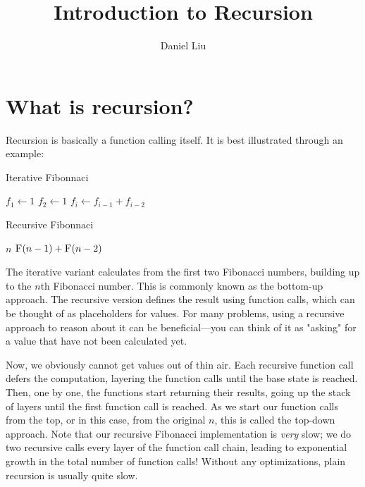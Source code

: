 \documentclass{article}
\title{Introduction to Recursion}
\author{Daniel Liu}
\begin{document}
    \maketitle

    \section{What is recursion?}
    Recursion is basically a function calling itself. It is best illustrated through an example:

    \begin{algorithm}
        \caption{Iterative Fibonnaci}
        \begin{algorithmic}[1]
                \State $f_1 \gets 1$
                \State $f_2 \gets 1$
                    \State $f_i \gets f_{i - 1} + f_{i - 2}$
                \EndFor
                \State {}
            \EndFunction
        \end{algorithmic}
    \end{algorithm}

    \begin{algorithm}
        \caption{Recursive Fibonnaci}
        \begin{algorithmic}[1]
                    \State \Return $n$
                \Else
                    \State \Return $\Call{F}{n - 1} + \Call{F}{n - 2}$
                \EndIf
            \EndFunction
        \end{algorithmic}
    \end{algorithm}

    The iterative variant calculates from the first two Fibonacci numbers, building up to the $n$th Fibonacci number. This is commonly known as the bottom-up approach. The recursive version defines the result using function calls, which can be thought of as placeholders for values. For many problems, using a recursive approach to reason about it can be beneficial---you can think of it as "asking" for a value that have not been calculated yet.

    Now, we obviously cannot get values out of thin air. Each recursive function call defers the computation, layering the function calls until the base state is reached. Then, one by one, the functions start returning their results, going up the stack of layers until the first function call is reached. As we start our function calls from the top, or in this case, from the original $n$, this is called the top-down approach. Note that our recursive Fibonacci implementation is \textit{very} slow; we do two recursive calls every layer of the function call chain, leading to exponential growth in the total number of function calls! Without any optimizations, plain recursion is usually quite slow.
\end{document}
